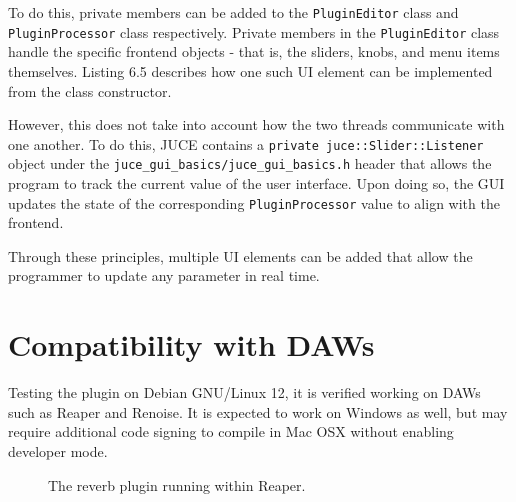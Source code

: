 To do this, private members can be added to the \verb|PluginEditor| class and \verb|PluginProcessor| class respectively. Private members in the \verb|PluginEditor| class handle the specific frontend objects - that is, the sliders, knobs, and menu items themselves. Listing 6.5 describes how one such UI element can be implemented from the class constructor.

\begin{singlespace}

\end{singlespace} \hfill \break
\hspace*{0.6cm}However, this does not take into account how the two threads communicate with one another. To do this, JUCE contains a \verb|private juce::Slider::Listener| object under the \verb|juce_gui_basics/juce_gui_basics.h| header that allows the program to track the current value of the user interface. Upon doing so, the GUI updates the state of the corresponding \verb|PluginProcessor| value to align with the frontend.

\begin{singlespace}

\end{singlespace} \hfill \break
\hspace*{0.6cm} Through these principles, multiple UI elements can be added that allow the programmer to update any parameter in real time.

\section{Compatibility with DAWs}
Testing the plugin on Debian GNU/Linux 12, it is verified working on DAWs such as Reaper and Renoise. It is expected to work on Windows as well, but may require additional code signing to compile in Mac OSX without enabling developer mode.

\begin{figure}[h] %
	\begin{center}
		\caption{The reverb plugin running within Reaper.}
	\end{center}
\end{figure}

